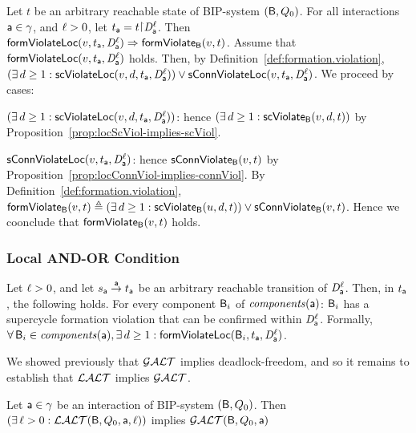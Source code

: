 \bp \label{prop:locFromViol-implies-formViol}
\label{prop:locformviol-implies-formviol}
Let $t$ be an arbitrary reachable state of BIP-system $(\B, Q_0)$.
For all interactions $\act \in \gamma$, and $\l > 0$, let $t_\act = t \pj \dsk{\act}{\l}$.
Then\\
\ind $ \locFormViol{v}{t_\act}{\act}{\l} \imp \formViol{v}{t}$.
\ep
%
\bpr
Assume that $\locFormViol{v}{t_\act}{\act}{\l}$ holds. Then, by Definition~\ref{def:formation.violation}, 
$(\exs d \ge 1: \locScViol{v}{d}{t_\act}{\act}{\l}) \lor \locConnViol{v}{t_\act}{\act}{\l}$.
We proceed by cases:
\bn
\item $(\exs d \ge 1: \locScViol{v}{d}{t_\act}{\act}{\l})$: hence $(\exs d \ge 1: \scViol{v}{d}{t})$ by Proposition~\ref{prop:locScViol-implies-scViol}.
\item $\locConnViol{v}{t_\act}{\act}{\l}$: hence $\connViol{v}{t}$ by Proposition~\ref{prop:locConnViol-implies-connViol}.
\en
By Definition~\ref{def:formation.violation},  $\formViol{v}{t}  \df (\exs d \ge 1: \scViol{u}{d}{t}) \lor \connViol{v}{t}$.
Hence we coonclude that $\formViol{v}{t}$ holds.
\epr




\subsubsection{Local AND-OR Condition}

 \label{def:lao}
Let $\l > 0$, and let $s_\act \goesto[\act] t_\act$ be an arbitrary reachable transition of $\dsk{\act}{\l}$.
Then, in $t_\act$, the following holds. 
For every component $\B_i$ of $\cmps{\act}$:  
$\B_i$ has a supercycle formation violation that can be confirmed within $\dsk{\act}{\l}$.
Formally,\\
\ind  $\fa \B_i \in \cmps{\act}, \ex d \ge 1: \locFormViol{\B_i}{t_\act}{\act}{\l}$.
\ed

We showed previously that $\GAO$ implies deadlock-freedom, and so it remains to establish that $\LAO$ implies $\GAO$. 




\bl \label{lemma:loc.ANDOR.implies.glob.AND-OR}
Let $\act \in \gamma$ be an interaction of BIP-system $(\B, Q_0)$. Then\\
\ind $(\ex \l > 0: \LAO(\B, Q_0, \act, \l))$ implies $\GAO(\B, Q_0, \act)$
\el
%

